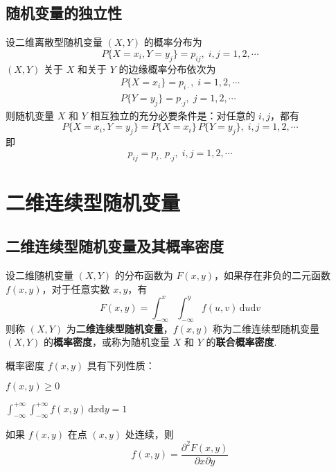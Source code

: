 \subsection{随机变量的独立性}

设二维离散型随机变量 $(X,Y)$ 的概率分布为
$$
P\{X = x_i, Y = y_j\} = p_{ij}, \; i,j=1,2,\cdots
$$
$(X,Y)$ 关于 $X$ 和关于 $Y$ 的边缘概率分布依次为
\begin{gather*}
    P\{X=x_i\}=p_{i\cdot}, \; i=1,2,\cdots\\
    P\{Y=y_j\}=p_{\cdot j}, \; j=1,2,\cdots
\end{gather*}
则随机变量 $X$ 和 $Y$ 相互独立的充分必要条件是：对任意的 $i,j$，都有
$$
P\{X = x_i, Y = y_j\} = P\{X=x_i\} \, P\{Y=y_j\}, \; i,j=1,2,\cdots
$$
即
$$
p_{ij} = p_{i \cdot} \, p_{\cdot j}, \; i,j=1,2,\cdots
$$

\section{二维连续型随机变量}

\subsection{二维连续型随机变量及其概率密度}

\begin{definition}
    设二维随机变量 $(X,Y)$ 的分布函数为 $F(x,y)$，如果存在非负的二元函数 $f(x,y)$，对于任意实数 $x,y$，有
    $$
    F(x,y) = \int_{-\infty}^x \int_{-\infty}^y f(u,v) \, \text{d}u \text{d}v
    $$
    则称 $(X,Y)$ 为\textbf{二维连续型随机变量}，$f(x,y)$ 称为二维连续型随机变量 $(X,Y)$ 的\textbf{概率密度}，或称为随机变量 $X$ 和 $Y$ 的\textbf{联合概率密度}.
\end{definition}

概率密度 $f(x,y)$ 具有下列性质：

\setcounter{propertyname}{0}

\begin{property} \label{property: density-1}
    $f(x,y) \geqslant 0$
\end{property}

\begin{property} \label{property: density-2}
    $\displaystyle\int_{-\infty}^{+\infty} \int_{-\infty}^{+\infty} f(x,y) \, \text{d}x \text{d}y = 1$
\end{property}

\begin{property}
    如果 $f(x,y)$ 在点 $(x,y)$ 处连续，则
    $$
    f(x,y) = \dfrac{\partial^2 F(x,y)}{\partial x \partial y}
    $$
\end{property}

